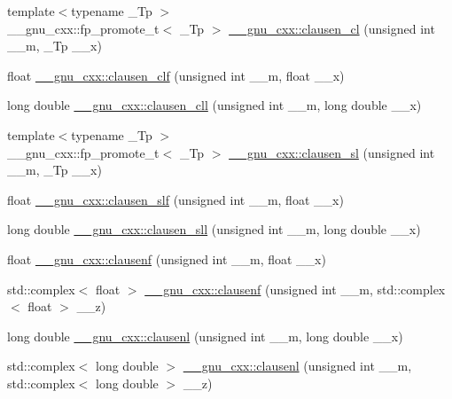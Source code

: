 \begin{DoxyCompactItemize}
\item 
{\footnotesize template$<$typename \+\_\+\+Tp $>$ }\\\+\_\+\+\_\+gnu\+\_\+cxx\+::fp\+\_\+promote\+\_\+t$<$ \+\_\+\+Tp $>$ \hyperlink{group__gnu__math__spec__func_ga8786b86db309998f93f877cfb9bdfd57}{\+\_\+\+\_\+gnu\+\_\+cxx\+::clausen\+\_\+cl} (unsigned int \+\_\+\+\_\+m, \+\_\+\+Tp \+\_\+\+\_\+x)
\item 
float \hyperlink{group__gnu__math__spec__func_ga5e1bf6c24eb4359ffacb49da62f0838b}{\+\_\+\+\_\+gnu\+\_\+cxx\+::clausen\+\_\+clf} (unsigned int \+\_\+\+\_\+m, float \+\_\+\+\_\+x)
\item 
long double \hyperlink{group__gnu__math__spec__func_gab06f3c94f96538167147f028711903a9}{\+\_\+\+\_\+gnu\+\_\+cxx\+::clausen\+\_\+cll} (unsigned int \+\_\+\+\_\+m, long double \+\_\+\+\_\+x)
\item 
{\footnotesize template$<$typename \+\_\+\+Tp $>$ }\\\+\_\+\+\_\+gnu\+\_\+cxx\+::fp\+\_\+promote\+\_\+t$<$ \+\_\+\+Tp $>$ \hyperlink{group__gnu__math__spec__func_gacb757b00309213cd96bb2bc6b5dc3c24}{\+\_\+\+\_\+gnu\+\_\+cxx\+::clausen\+\_\+sl} (unsigned int \+\_\+\+\_\+m, \+\_\+\+Tp \+\_\+\+\_\+x)
\item 
float \hyperlink{group__gnu__math__spec__func_gadd92821afcbfbdc79496b091b12a357f}{\+\_\+\+\_\+gnu\+\_\+cxx\+::clausen\+\_\+slf} (unsigned int \+\_\+\+\_\+m, float \+\_\+\+\_\+x)
\item 
long double \hyperlink{group__gnu__math__spec__func_ga227d105b4c0659c4402de7217bb9b65b}{\+\_\+\+\_\+gnu\+\_\+cxx\+::clausen\+\_\+sll} (unsigned int \+\_\+\+\_\+m, long double \+\_\+\+\_\+x)
\item 
float \hyperlink{group__gnu__math__spec__func_ga6422bdec1a3c930fb1623094cd2eaff2}{\+\_\+\+\_\+gnu\+\_\+cxx\+::clausenf} (unsigned int \+\_\+\+\_\+m, float \+\_\+\+\_\+x)
\item 
std\+::complex$<$ float $>$ \hyperlink{group__gnu__math__spec__func_ga98b5ba1e5de4ef2e0e9422ac8d9ce2ad}{\+\_\+\+\_\+gnu\+\_\+cxx\+::clausenf} (unsigned int \+\_\+\+\_\+m, std\+::complex$<$ float $>$ \+\_\+\+\_\+z)
\item 
long double \hyperlink{group__gnu__math__spec__func_ga33132bab39c8d78dde807b45fc06de52}{\+\_\+\+\_\+gnu\+\_\+cxx\+::clausenl} (unsigned int \+\_\+\+\_\+m, long double \+\_\+\+\_\+x)
\item 
std\+::complex$<$ long double $>$ \hyperlink{group__gnu__math__spec__func_gae39368808280f5c1b80dce7c2f4a67a7}{\+\_\+\+\_\+gnu\+\_\+cxx\+::clausenl} (unsigned int \+\_\+\+\_\+m, std\+::complex$<$ long double $>$ \+\_\+\+\_\+z)

\end{DoxyCompactItemize}

